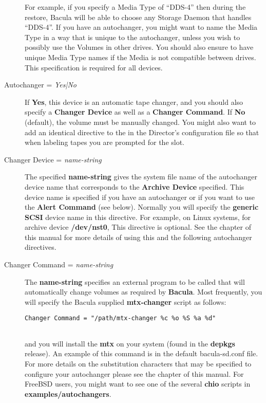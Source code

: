 \begin{description}
For example, if you specify a Media  Type of ``DDS-4'' then during the
restore, Bacula  will be able to choose any Storage Daemon that handles 
``DDS-4''. If you have an autochanger, you might  want to name the Media Type
in a way that is unique to the  autochanger, unless you wish to possibly use
the Volumes in  other drives. You should also ensure to have unique Media 
Type names if the Media is not compatible between drives.  This specification
is required for all devices. 

\label{Autochanger}

\item [Autochanger = {\it Yes|No}]
   If {\bf Yes}, this device is an automatic tape changer, and  you should also
specify a {\bf Changer Device} as well as  a {\bf Changer Command}.  If {\bf
No} (default), the volume must be manually changed.  You might also want to
add an identical directive to the  
  in the Director's
configuration file so that  when labeling tapes you are prompted for the slot.
 

\item [Changer Device = {\it name-string}]
   The specified {\bf name-string} gives the system file name of the  autochanger
device name that corresponds to the {\bf Archive Device}  specified. This
device name is specified if you have an autochanger  or if you want to use the
{\bf Alert Command} (see below).  Normally you will specify the {\bf generic
SCSI} device  name in this directive. For example, on Linux systems, for 
archive device {\bf /dev/nst0}, This directive is optional.  See the 
  chapter of this
manual for more details of using this and the  following autochanger
directives. 

\item [Changer Command = {\it name-string}]
   The {\bf name-string} specifies an external program to be called  that will
automatically change volumes as required by {\bf Bacula}.  Most frequently,
you will specify the Bacula supplied {\bf mtx-changer}  script as follows:  

\footnotesize
\begin{verbatim}
Changer Command = "/path/mtx-changer %c %o %S %a %d"
      
\end{verbatim}
\normalsize

and you will install the {\bf mtx} on your system (found  in the {\bf depkgs}
release). An example of this command is  in the default bacula-sd.conf file. 
For more details on the substitution characters that may be specified  to
configure your autochanger please see  the 
 chapter of this  manual.
For FreeBSD users, you might want to see one of the  several {\bf chio}
scripts in {\bf examples/autochangers}.  


\end{description}
